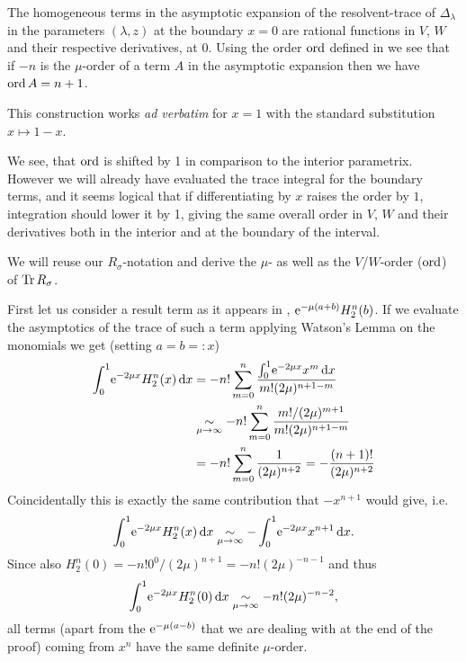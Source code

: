 \begin{MainTheorem}
  The homogeneous terms in the asymptotic expansion of the
  resolvent-trace of $\Delta_\lambda$ in the parameters $(\lambda,z)$ at the
  boundary $x = 0$ are rational functions in $V$, $W$ and their respective
  derivatives, at $0$. Using the order $\ord$ defined in  we
  see that if $-n$ is the $\mu$-order of a term $A$ in the asymptotic expansion
  then we have $\ord A = n + 1$.
  \begin{Remark}
    This construction works \emph{ad verbatim} for $x=1$ with the standard
    substitution $x\mapsto 1 - x$.
  \end{Remark}
  \begin{Remark}
    We see, that $\ord$ is shifted by 1 in comparison to the interior
    parametrix. However we will already have evaluated the trace integral for
    the boundary terms, and it seems logical that if differentiating by $x$
    raises the order by $1$, integration should lower it by 1, giving the same
    overall order in $V$, $W$ and their derivatives both in the interior and at
    the boundary of the interval.
  \end{Remark}
  \begin{Proof}
    We will reuse our $R_\sigma$-notation and derive the $\mu$- as well as the
    $V$/$W$-order ($\ord$) of $\Tr R_\sigma$.

    First let us consider a result term as it appears in ,
    $\Eto{-\mu(a+b)}H^n_2(b)$. If we evaluate the asymptotics of the trace of
    such a term applying Watson's Lemma on the monomials we get (setting $a = b
    =: x$)
    \begin{align}
      \Int{x}{\Eto{-2\mu x}H^n_2(x)}
      &= -n!\sum_{m=0}^n \frac{\Int{x}{\Eto{-2\mu x} x^m}}{m!(2\mu)^{n+1-m}} \\
      &\SimMu -n!\sum_{m=0}^n \frac{m! / (2\mu)^{m+1}}{m!(2\mu)^{n+1-m}} \\
      &= -n!\sum_{m=0}^n \frac{1}{(2\mu)^{n+2}} = -\frac{(n+1)!}{(2\mu)^{n+2}}
    \end{align}
    Coincidentally this is exactly the same contribution that $-x^{n+1}$ would
    give, i.e.
    \begin{align*}
      \Int{x}{\Eto{-2\mu x}H^n_2(x)} \SimMu -\Int{x}{\Eto{-2\mu x}x^{n+1}}.
    \end{align*}
    Since also $H^n_2(0) = -n! 0^0 / (2\mu)^{n+1} = -n! (2\mu)^{-n-1}$ and thus
    \begin{align*}
      \Int{x}{\Eto{-2\mu x}H^n_2(0)} \SimMu -n! (2\mu)^{-n-2},
    \end{align*}
    all terms (apart from the $\Eto{-\mu(a-b)}$ that we are dealing with at the
    end of the proof) coming from $x^n$ have the same definite $\mu$-order.


\end{Proof}
\end{MainTheorem}
